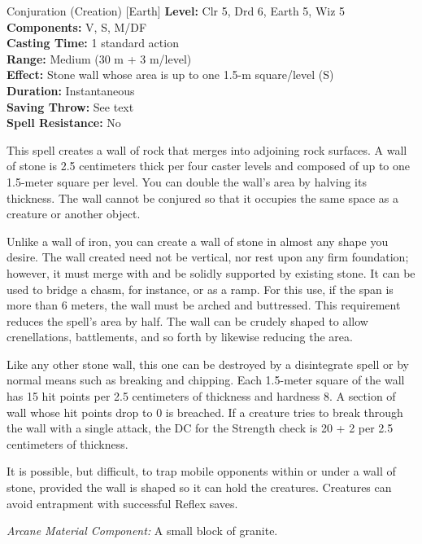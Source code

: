 {Conjuration (Creation) [Earth]}
{
	\textbf{Level:}
	Clr 5, Drd 6, Earth 5, Wiz 5\\
	\textbf{Components:}
	V, S, M/DF\\
	\textbf{Casting Time:}
	1 standard action\\
	\textbf{Range:}
	Medium (30 m + 3 m/level)\\
	\textbf{Effect:}
	Stone wall whose area is up to one 1.5-m square/level (S)\\
	\textbf{Duration:}
	Instantaneous\\
	\textbf{Saving Throw:}
	See text\\
	\textbf{Spell Resistance:}
	No\\
}
{
	This spell creates a wall of rock that merges into adjoining rock surfaces. A wall of stone is 2.5 centimeters thick per four caster levels and composed of up to one 1.5-meter square per level. You can double the wall's area by halving its thickness. The wall cannot be conjured so that it occupies the same space as a creature or another object.

	Unlike a wall of iron, you can create a wall of stone in almost any shape you desire. The wall created need not be vertical, nor rest upon any firm foundation; however, it must merge with and be solidly supported by existing stone. It can be used to bridge a chasm, for instance, or as a ramp. For this use, if the span is more than 6 meters, the wall must be arched and buttressed. This requirement reduces the spell's area by half. The wall can be crudely shaped to allow crenellations, battlements, and so forth by likewise reducing the area.

	Like any other stone wall, this one can be destroyed by a disintegrate spell or by normal means such as breaking and chipping. Each 1.5-meter square of the wall has 15 hit points per 2.5 centimeters of thickness and hardness 8. A section of wall whose hit points drop to 0 is breached. If a creature tries to break through the wall with a single attack, the DC for the Strength check is 20 + 2 per 2.5 centimeters of thickness.

	It is possible, but difficult, to trap mobile opponents within or under a wall of stone, provided the wall is shaped so it can hold the creatures. Creatures can avoid entrapment with successful Reflex saves.

	\textit{Arcane Material Component:}
	A small block of granite.

}
